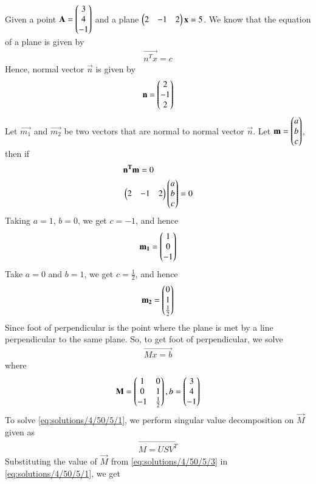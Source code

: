 Given a point $\mathbf{A} = \begin{pmatrix}3 \\4\\-1\end{pmatrix}$  and a plane $\begin{pmatrix}2 & -1 & 2\end{pmatrix}\mathbf{x}=5$. We know that the equation of a plane is given by
\begin{align}
	\vec{n^Tx}= c
\end{align}
Hence, normal vector $\vec{n}$ is given by
\begin{align}
	\mathbf{n} = \begin{pmatrix}2 \\ -1\\ 2 \end{pmatrix}
\end{align}
Let $\vec{m_1}$ and $\vec{m_2}$ be two vectors that are normal to normal vector $\vec{n}$.
Let $\mathbf{m}= \begin{pmatrix}a\\b\\c\end{pmatrix}$, then if
\begin{align}
& \mathbf{n^Tm}= 0 \\
& \begin{pmatrix}2 & -1 &2\end{pmatrix}\begin{pmatrix}a\\b\\c\end{pmatrix} = 0
\end{align}
Taking $a =1$, $b=0$, we get $c=-1$, and hence
\begin{align}
	\mathbf{m_1}= \begin{pmatrix}1\\0\\-1\end{pmatrix}
\end{align}
Take $a=0$ and $b=1$, we get $c=\frac{1}{2}$, and hence
\begin{align}
	\mathbf{m_2}= \begin{pmatrix}0\\1\\\frac{1}{2}\end{pmatrix}
\end{align}
Since  foot of perpendicular is the point where the plane is met by a line perpendicular to the same plane. So, to get foot of perpendicular, we solve
\begin{align}
\vec{Mx=b} \label{eq:solutions/4/50/5/1}
\end{align}
where
\begin{align}
\mathbf{M} = \begin{pmatrix}1 & 0 \\ 0 & 1 \\ -1 & \frac{1}{2}\end{pmatrix},b = \begin{pmatrix}3 \\4\\-1\end{pmatrix}\label{eq:solutions/4/50/5/2}	
\end{align}
To solve \eqref{eq:solutions/4/50/5/1}, we perform singular value decomposition on $\vec{M}$ given as 
\begin{align}
	\vec{M = USV^T }\label{eq:solutions/4/50/5/3}
\end{align}
Substituting the value of $\vec{M}$ from \eqref{eq:solutions/4/50/5/3} in \eqref{eq:solutions/4/50/5/1}, we get
